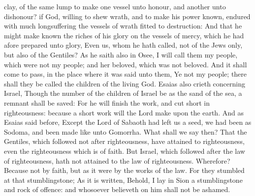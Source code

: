 {clay,
of the
same
lump to
make
one
vessel
unto
honour,
and
another
unto
dishonour?
if
God,
willing to
shew
{}
wrath,
and to
make
his
power
known,
endured
with
much
longsuffering the
vessels of
wrath
fitted
to
destruction:
And
that he might make
known the
riches of
his
glory
on the
vessels of
mercy,
which he had afore
prepared
unto
glory,
Even
us,
whom he hath
called,
not
of the
Jews
only,
but
also
of the
Gentiles?
As he
saith
also
in
Osee, I will
call
them
my
people, which
were
not
my
people;
and
her
beloved, which
was
not
beloved.
And it shall come to
pass,
{}
in the
place
where it was
said unto
them,
Ye
{}
not
my
people;
there shall they be
called the
children of
the
living
God.
Esaias
also
crieth
concerning
Israel,
Though the
number of the
children of
Israel
be
as the
sand of the
sea, a
remnant shall be
saved:
For he will
finish the
work,
and
cut
{}
short
in
righteousness:
because
a
short
work
will the
Lord
make
upon the
earth.
And
as
Esaias said
before,
Except the
Lord of
Sabaoth had
left
us a
seed, we had
been
as
Sodoma,
and been made
like unto
Gomorrha.
What shall we
say
then?
That the
Gentiles, which
followed
not
after
righteousness, have attained
to
righteousness,
even the
righteousness which
is
of
faith.
But
Israel, which followed
after the
law of
righteousness,
hath
not
attained
to the
law of
righteousness.
Wherefore?
Because
{}
not
by
faith,
but as it
were
by the
works of the
law.
For they
stumbled at
that
stumblingstone;
As it is
written,
Behold, I
lay
in
Sion a
stumblingstone
and
rock of
offence:
and
whosoever
believeth
on
him
shall
not be
ashamed.

}
